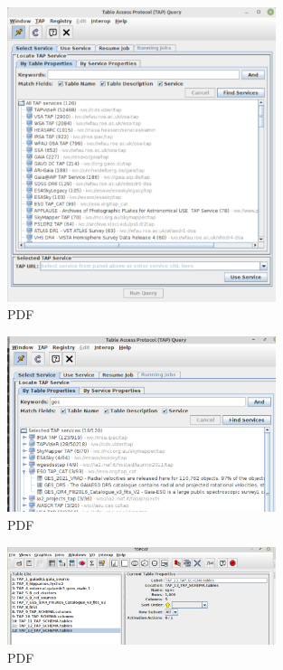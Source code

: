 \begin{figure}
	\centering
	\includegraphics[width=0.7\textwidth]{img/tesis/tap_query.pdf}
	\caption{PDF}
	\label{fig:tap_query}
\end{figure}


\begin{figure}
	\centering
	\includegraphics[width=0.7\textwidth]{img/tesis/tap_ges_service.pdf}
	\caption{PDF}
	\label{fig:tap_ges_service}
\end{figure}

\begin{figure}
	\centering
	\includegraphics[width=0.7\textwidth]{img/tesis/tap_multi_sources.pdf}
	\caption{PDF}
	\label{fig:tap_multi_services}
\end{figure}

